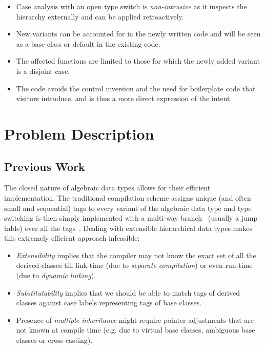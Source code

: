 \begin{itemize}
\setlength{\itemsep}{0pt}
\setlength{\parskip}{0pt}
\item Case analysis with an open type switch is \emph{non-intrusive} as it 
      inspects the hierarchy externally and can be applied retroactively. 
\item New variants can be accounted for in the newly written code and will be 
      seen as a base class or default in the existing code.
\item The affected functions are limited to those for which the newly added 
      variant is a disjoint case.
\item The code avoids the control inversion and the need for boilerplate code 
      that visitors introduce, and is thus a more direct expression of the 
      intent.
\end{itemize}

\section{Problem Description} %
\label{sec:probl}

\subsection{Previous Work}
\label{sec:prev}

The closed nature of algebraic data types allows for their efficient 
implementation. The traditional compilation scheme assigns unique (and often 
small and sequential) tags to every variant of the algebraic data type and type 
switching is then simply implemented with a multi-way branch~\cite{Spuler94} 
(usually a jump table) over all the tags~\cite{Augustsson85}. Dealing with 
extensible hierarchical data types makes this extremely efficient approach 
infeasible:

\begin{itemize}
\setlength{\itemsep}{0pt}
\setlength{\parskip}{0pt}
\item \emph{Extensibility} implies that the compiler may not know the exact set 
      of all the derived classes till link-time (due to \emph{separate compilation}) 
      or even run-time (due to \emph{dynamic linking}).
\item \emph{Substitutability} implies that we should be able to 
      match tags of derived classes against case labels representing tags of 
      base classes.
\item Presence of \emph{multiple inheritance} might require pointer adjustments 
      that are not known at compile time (e.g. due to virtual base classes, 
      ambiguous base classes or cross-casting).
\end{itemize}

